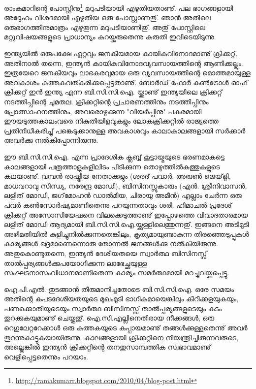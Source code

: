 ﻿
\vskip 2pt

രാംകുമാറിന്റെ പോസ്റ്റിനു\footnote{\url{http://ramakumarr.blogspot.com/2010/04/blog-post.html}} മറുപടിയായി എഴുതിയതാണു്. പല ഭാഗങ്ങളായി അദ്ദേഹം വിശദമായി എഴുതിയ ഒരു പോസ്റ്റാണതു്. ഞാന്‍ അതിലെ ഒരുഭാഗത്തിനുമാത്രം എഴുതുന്ന മറുപടിയാണിതു്. അതു് പോസ്റ്റിലെ മറ്റുവിഷയങ്ങളുടെ പ്രാധാന്യം കുറയ്ക്കരുതെന്നു കരുതി ഇവിടെയിടുന്നു.

ഇന്ത്യയില്‍ ഒരുപക്ഷേ ഏറ്റവും ജനകീയമായ കായികവിനോദമാണു് ക്രിക്കറ്റ്. അതിനാല്‍ തന്നെ, ഇന്ത്യന്‍ കായികവിനോദവ്യവസായത്തിന്റെ ആണിക്കല്ലും. ഇത്രയേറെ ജനകീയവും ലാഭകരവുമായ ഒരു വ്യവസായത്തിന്റെ മൊത്തമായുള്ള അവകാശം കുത്തകവത്കരിക്കപ്പെട്ടതാണു്. ബോര്‍ഡ് ഫോര്‍ കണ്‍ട്രോള്‍ ഓഫ് ക്രിക്കറ്റ് ഇന്‍ ഇന്ത്യ എന്ന ബി.സി.സി.ഐ. യ്ക്കാണു് ഇന്ത്യയിലെ ക്രിക്കറ്റ് നടത്തിപ്പിന്റെ ചുമതല. ക്രിക്കറ്റിന്റെ പ്രചാരണത്തിനും നടത്തിപ്പിനും പ്രോത്സാഹനത്തിനും, അവരൊഴുക്കുന്ന "വിയര്‍പ്പിനു" പകരമായി ഈയടുത്തകാലംവരെ നികുതിയിളവുകളും ലോകക്രിക്കറ്റില്‍ രാജ്യത്തെ പ്രതിനിധീകരിച്ചു് പങ്കെടുക്കാനുള്ള അവകാശവും കാലാകാലങ്ങളായി സര്‍ക്കാര്‍ അവര്‍ക്കു നല്‍കിപ്പോന്നിരുന്നു.

ഈ ബി.സി.സി.ഐ. എന്ന പ്രാദേശിക ക്ലബ്ബ് കൂട്ടായ്മയുടെ ഭരണമാകട്ടെ കാലങ്ങളായി പത്രത്താളുകളിലിടം പിടിക്കുന്ന തൊഴുത്തില്‍കുത്തുകളുടെ കഥയാണു്. വമ്പന്‍ രാഷ്ട്രീയ നേതാക്കളും (ശരദ് പവാര്‍, അരുണ്‍ ജെയ്റ്റ്ലി, മാധവറാവു സിന്ധ്യ, നരേന്ദ്ര മോഡി), ബിസിനസ്സുകാരും (എന്‍. ശ്രീനിവാസന്‍, ലളിത് മോഡി, ജഗ്‌മോഹന്‍ ഡാല്‍മിയ, ചിരായു അമീന്‍) എല്ലാം ചേര്‍ന്ന ഒരു പവര്‍ കണ്‍സോര്‍ഷ്യമാണിതെന്നു പറയുന്നതാവും ശരി. ഹിമാചല്‍ പ്രദേശ് ക്രിക്കറ്റ് അസോസിയേഷനെ വിലക്കെടുത്താണു് ഇപ്പോഴത്തെ വിവാദതാരമായ ലളിത് മോഡി ആദ്യമായി ബി.സി.സി.ഐ.യ്ക്കുള്ളിലെത്തുന്നതു്. ഇങ്ങനെ അടിമുടി അഴിമതിയില്‍ കുളിച്ചുനില്‍ക്കുന്നതെങ്കിലും, കൃത്യമായുണ്ടാകുന്ന തിരഞ്ഞെടുപ്പുകള്‍ കാര്യങ്ങള്‍ ഭദ്രമാണെന്നൊരു തോന്നല്‍ ജനങ്ങള്‍ക്കു നല്‍കിയിരുന്നു. അതുകൊണ്ടുതന്നെ, ഇന്ത്യന്‍ ദേശീയതയെ സ്വാര്‍ത്ഥ ബിസിനസ്സ് താല്‍പ്പര്യങ്ങള്‍ക്കുപയോഗിക്കുന്ന ലാഭേച്ഛയുള്ള സംഘടനാസംവിധാനമാണിതെന്ന കാര്യം സമര്‍ത്ഥമായി മറച്ചുവയ്ക്കപ്പെട്ടു.

ഐ.പി.എല്‍. തുടങ്ങാന്‍ തീരുമാനിച്ചതോടെ ബി.സി.സി.ഐ. ഒരേ സമയം അതിന്റെ കപടദേശീയതയുടെ മുഖംമൂടി ഭാഗികമായെങ്കിലും കീറീക്കളയുകയും, പണക്കൊതിയുടെയും സ്വാര്‍ത്ഥ ബിസിനസ്സ് താല്‍പ്പര്യങ്ങളുടെയും കുടം തുറക്കുകയുമാണു് ചെയ്തതു്. ഐ.സി.എല്ലിനെതിരായ നീക്കങ്ങള്‍, ഒരു റെഗുലേറ്ററേക്കാള്‍ ഒരു കുത്തകയുടെ കുപ്പായമാണു് തങ്ങള്‍ക്കുള്ളതെന്നു് അവര്‍ തുറന്നുകാട്ടുകയായിരുന്നു. കാലങ്ങളായി ക്രിക്കറ്റിനെ നിയന്ത്രിച്ചിരുന്നവരുടെ, അല്ലെങ്കില്‍ ഇന്ത്യന്‍ ക്രിക്കറ്റിന്റെ തനതുസാമ്പത്തിക സ്വഭാവമാണു് വെളിപ്പെട്ടതെന്നും പറയാം.

